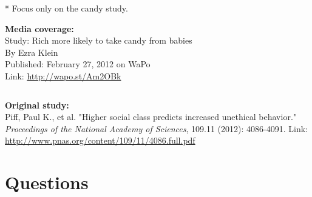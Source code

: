 \documentclass[12pt]{article}
\begin{document}
* Focus only on the candy study.

\begin{minipage}[t]{0.49\textwidth}
\textbf{Media coverage:} \\
{\small
Study: Rich more likely to take candy from babies \\
By Ezra Klein \\
Published: February 27, 2012 on WaPo \\
Link: \url{http://wapo.st/Am2OBk} \\
}
\end{minipage}
\begin{minipage}[t]{0.02\textwidth}
$\:$ \\
\end{minipage}
\begin{minipage}[t]{0.49\textwidth}
\textbf{Original study:} \\
{\small
Piff, Paul K., et al. "Higher social class predicts increased unethical behavior." 
\textit{Proceedings of the National Academy of Sciences}, 109.11 (2012): 4086-4091.
Link: \url{http://www.pnas.org/content/109/11/4086.full.pdf} \\
}
\end{minipage}

\pagebreak

\section{Questions}
\end{document}
